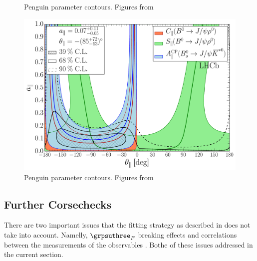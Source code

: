 \begin{figure}[h]
\begin{center}
\begin{subfigure}{1\textwidth}
    \caption{}
    \label{pengPlot_perp}
  \end{subfigure}
  \caption{Penguin parameter contours. Figures from~\cite{DeBruyn-thesis}}
\end{center}
\end{figure}

\begin{figure}[h]
\begin{center}
  \includegraphics[trim=0.0cm 0.0cm 0.0cm 0.0cm, clip=true,scale=0.33]{Figures/Chapter5/Penguin_Contribution_Ang_vs_Abs_allB2VV_Para.pdf}
  \caption{Penguin parameter contours. Figures from~\cite{DeBruyn-thesis}}
  \label{pengPlot_para}
\end{center}
\end{figure}



\subsection{Further Corsechecks}
There are two important issues that the fitting strategy as described in 
does not take into account. Namelly, $\grpsuthree_F$ breaking effects and correlations between
the measurements of the observables . Bothe of these issues addressed in the current section.

